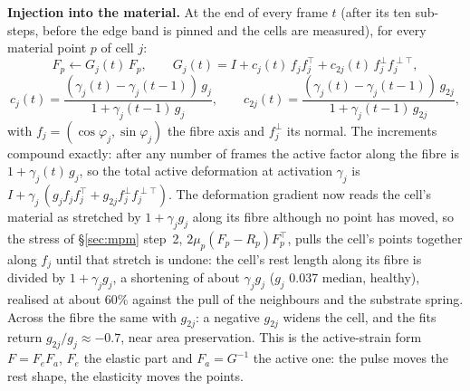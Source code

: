\documentclass[10pt]{article}
\begin{document}
\textbf{Injection into the material.} At the end of every frame $t$ (after its ten sub-steps, before the edge
band is pinned and the cells are measured), for every material point $p$ of cell $j$:
\[ F_p \leftarrow G_j(t)\,F_p, \qquad G_j(t) = I + c_j(t)\, f_j f_j^{\!\top} + c_{2j}(t)\, f_j^{\perp} f_j^{\perp\top}, \]
\[ c_j(t) = \frac{(\gamma_j(t) - \gamma_j(t-1))\, g_j}{1 + \gamma_j(t-1)\, g_j}, \qquad
   c_{2j}(t) = \frac{(\gamma_j(t) - \gamma_j(t-1))\, g_{2j}}{1 + \gamma_j(t-1)\, g_{2j}}, \]
with $f_j = (\cos\varphi_j, \sin\varphi_j)$ the fibre axis and $f_j^{\perp}$ its normal. The increments compound
exactly: after any number of frames the active factor along the fibre is $1 + \gamma_j(t)\,g_j$, so the total active
deformation at activation $\gamma_j$ is $I + \gamma_j\,(g_j f_j f_j^{\!\top} + g_{2j} f_j^{\perp} f_j^{\perp\top})$.
The deformation gradient now reads the cell's material as stretched by $1 + \gamma_j g_j$ along its fibre although
no point has moved, so the stress of \S\ref{sec:mpm} step~2, $2\mu_p (F_p - R_p) F_p^{\!\top}$, pulls the cell's
points together along $f_j$ until that stretch is undone: the cell's rest length along its fibre is divided by
$1 + \gamma_j g_j$, a shortening of about $\gamma_j g_j$ ($g_j$ 0.037 median, healthy), realised at about 60\%
against the pull of the neighbours and the substrate spring. Across the fibre the same with $g_{2j}$: a negative
$g_{2j}$ widens the cell, and the fits return $g_{2j}/g_j \approx -0.7$, near area preservation. This is the
active-strain form $F = F_e F_a$, $F_e$ the elastic part and $F_a = G^{-1}$ the active one: the pulse moves the rest
shape, the elasticity moves the points.
\end{document}
